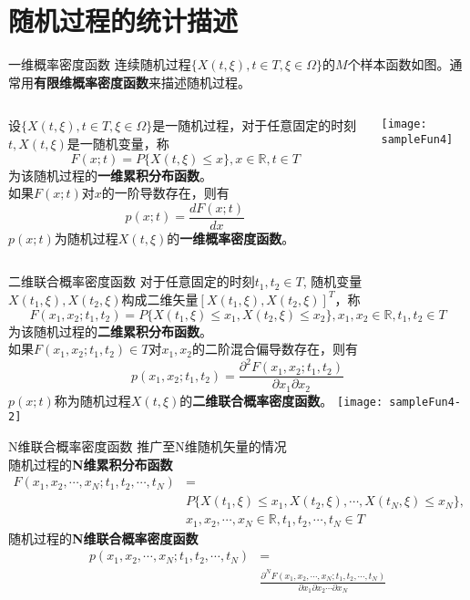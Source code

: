 \section{随机过程的统计描述}

\begin{frame}{一维概率密度函数}
连续随机过程$\{X(t,\xi),t\in T,\xi\in\Omega \}$的$M$个样本函数如图。通常用\textbf{有限维概率密度函数}来描述随机过程。

\medskip
\begin{columns}
	\begin{block}{}
		设$\{X(t,\xi),t\in T,\xi\in\Omega \}$是一随机过程，对于任意固定的时刻$t,X(t,\xi)$是一随机变量，称
		\[F(x;t)=P\{X(t,\xi)\le x\},x\in\mathbb{R},t\in T \]
		为该随机过程的\textbf{一维累积分布函数}。\\
		如果$F(x;t)$对$x$的一阶导数存在，则有
		\[p(x;t)=\frac{dF(x;t)}{dx}\]
		$p(x;t)$为随机过程$X(t,\xi)$的\textbf{一维概率密度函数}。
	\end{block}
	\texttt{[image: sampleFun4]}
\end{columns}
\end{frame}

\begin{frame}{二维联合概率密度函数}
对于任意固定的时刻$t_1,t_2\in T$, 随机变量$X(t_1,\xi),X(t_2,\xi)$构成二维矢量$[X(t_1,\xi),X(t_2,\xi)]^T$，称
\[F(x_1,x_2;t_1,t_2)=P\{X(t_1,\xi)\le x_1,X(t_2,\xi)\le x_2\},x_1,x_2\in\mathbb{R},t_1,t_2\in T \]
为该随机过程的\textbf{二维累积分布函数}。\\
如果$F(x_1,x_2;t_1,t_2)\in T$对$x_1,x_2$的二阶混合偏导数存在，则有
\[p(x_1,x_2;t_1,t_2)=\frac{\partial^2 F(x_1,x_2;t_1,t_2)}{\partial x_1\partial x_2}\]
$p(x;t)$称为随机过程$X(t,\xi)$的\textbf{二维联合概率密度函数}。
\texttt{[image: sampleFun4-2]}
\end{frame}

\begin{frame}{N维联合概率密度函数}
推广至N维随机矢量的情况\\
随机过程的\textbf{N维累积分布函数}
\begin{align*}
F(x_1,x_2,\cdots,x_N;t_1,t_2,\cdots,t_N)&=\\
&P\{X(t_1,\xi)\le x_1,X(t_2,\xi),\cdots,X(t_N,\xi)\le x_N\},&\\
&x_1,x_2,\cdots,x_N\in\mathbb{R},t_1,t_2,\cdots,t_N\in T
\end{align*}
随机过程的\textbf{N维联合概率密度函数}
\begin{align*}
p(x_1,x_2,\cdots,x_N;t_1,t_2,\cdots,t_N)&=\\
&\frac{\partial^N F(x_1,x_2,\cdots,x_N;t_1,t_2,\cdots,t_N)}{\partial x_1\partial x_2\cdots\partial x_N}
\end{align*}
\end{frame}

